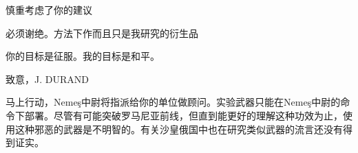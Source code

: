 
\begin{scpbox}

慎重考虑了你的建议

必须谢绝。方法下作而且只是我研究的衍生品

你的目标是征服。我的目标是和平。

致意，J. DURAND

\end{scpbox}


\begin{scpbox}

马上行动，Nemeş中尉将指派给你的单位做顾问。实验武器只能在Nemeş中尉的命令下部署。尽管有可能突破罗马尼亚前线，但直到能更好的理解这种功效为止，使用这种邪恶的武器是不明智的。有关沙皇俄国中也在研究类似武器的流言还没有得到证实。

\end{scpbox}


